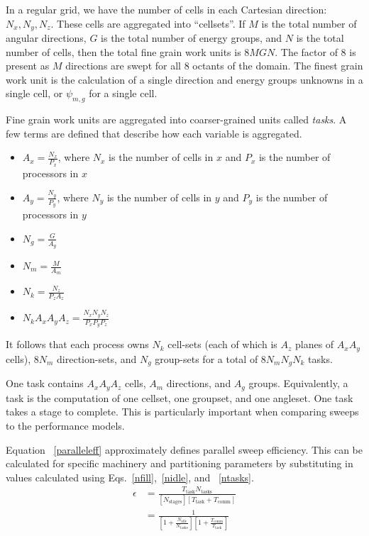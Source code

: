 \documentclass[11pt, letterpaper,titlepage,oneside]{article}
\begin{document}
In a regular grid, we have the  number of cells in each Cartesian direction: $N_x, N_y, N_z$. These cells are aggregated into ``cellsets''. If $M$ is the total number of angular directions, $G$ is the total number of energy groups, and $N$ is the total number of cells, then the total fine grain work units is $8MGN$. The factor of 8 is present as $M$ directions are swept for all 8 octants of the domain. The finest grain work unit is the calculation of a single direction and energy groups unknowns in a single cell, or $\psi_{m,g}$ for a single cell.

Fine grain work units are aggregated into coarser-grained units called \textit{tasks}. A few terms are defined that describe how each variable is aggregated.
\begin{itemize}
\item $A_x = \frac{N_x}{P_x}$, where $N_x$ is the number of cells in $x$ and $P_x$ is the number of processors in $x$
\item $A_y = \frac{N_y}{P_y}$, where $N_y$ is the number of cells in $y$ and $P_y$ is the number of processors in $y$
\item $N_g = \frac{G}{A_g}$
\item $N_m = \frac{M}{A_m}$
\item $N_k = \frac{N_z}{P_z A_z}$
\item $N_k A_x A_y A_z = \frac{N_x N_y N_z}{P_x P_y P_z}$
\end{itemize}

It follows that each process owns $N_k$ cell-sets (each of which is $A_z$ planes of $A_x A_y$ cells), $8N_m$ direction-sets, and $N_g$ group-sets for a total of $8N_m N_g N_k$ tasks.

One task contains $A_x A_y A_z$ cells, $A_m$ directions, and $A_g$ groups. Equivalently, a task is the computation of one cellset, one groupset, and one angleset. One task takes a stage to complete.  This is particularly important when comparing sweeps to the performance models. 

Equation ~\eqref{paralleleff} approximately defines parallel sweep efficiency. This can be calculated for specific machinery and partitioning parameters by substituting in values calculated using Eqs.~\eqref{nfill},~\eqref{nidle}, and ~\eqref{ntasks}.
\begin{equation}\label{paralleleff}
\begin{split}
\epsilon &= \frac{T_{\text{task}} N_{\text{tasks}}}{[N_{\text{stages}}] [T_{\text{task}} + T_{\text{comm}}]} \\
            &=\frac{1}{[1+\frac{N_{\text{idle}}}{N_{\text{tasks}}}][1 + \frac{T_{\text{comm}}}{T_{\text{task}}}]}
\end{split}
\end{equation}
\end{document}
